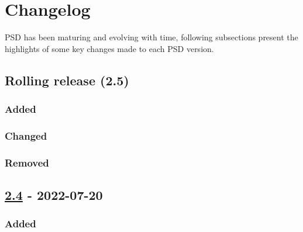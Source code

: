 \section{Changelog}

PSD has been maturing and evolving with time, following subsections
present the highlights of some key changes made to each PSD version.

\subsection{Rolling release (2.5)}

\subsubsection{Added}

\subsubsection{Changed}

\subsubsection{Removed}

\subsection{\texorpdfstring{\href{https://gitlab.com/PsdSolver/psd_sources/-/tree/v2.4}{2.4}
- 2022-07-20}{2.4 - 2022-07-20}}

\subsubsection{Added}

